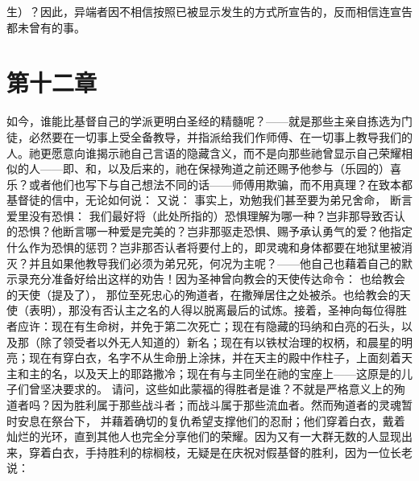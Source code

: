 生）？因此，异端者因不相信按照已被显示发生的方式所宣告的，反而相信连宣告都未曾有的事。\par


\section{第十二章}

如今，谁能比基督自己的学派更明白圣经的精髓呢？——就是那些主亲自拣选为门徒，必然要在一切事上受全备教导，并指派给我们作师傅、在一切事上教导我们的人。祂更愿意向谁揭示祂自己言语的隐藏含义，而不是向那些祂曾显示自己荣耀相似的人——即、和，以及后来的，祂在保禄殉道之前还赐予他参与（乐园的）喜乐？或者他们也写下与自己想法不同的话——师傅用欺骗，而不用真理？在致本都基督徒的信中，无论如何说：  又说：  事实上，劝勉我们甚至要为弟兄舍命， 断言爱里没有恐惧：  我们最好将（此处所指的）恐惧理解为哪一种？岂非那导致否认的恐惧？他断言哪一种爱是完美的？岂非那驱走恐惧、赐予承认勇气的爱？他指定什么作为恐惧的惩罚？岂非那否认者将要付上的，即灵魂和身体都要在地狱里被消灭？并且如果他教导我们必须为弟兄死，何况为主呢？——他自己也藉着自己的默示录充分准备好给出这样的劝告！因为圣神曾向教会的天使传达命令：  也给教会的天使（提及了）， 那位至死忠心的殉道者，在撒殚居住之处被杀。也给教会的天使（表明），那没有否认主之名的人得以脱离最后的试炼。接着，圣神向每位得胜者应许：现在有生命树，并免于第二次死亡；现在有隐藏的玛纳和白亮的石头，以及那（除了领受者以外无人知道的）新名；现在有以铁杖治理的权柄，和晨星的明亮；现在有穿白衣，名字不从生命册上涂抹，并在天主的殿中作柱子，上面刻着天主和主的名，以及天上的耶路撒冷；现在有与主同坐在祂的宝座上——这原是的儿子们曾坚决要求的。 请问，这些如此蒙福的得胜者是谁？不就是严格意义上的殉道者吗？因为胜利属于那些战斗者；而战斗属于那些流血者。然而殉道者的灵魂暂时安息在祭台下， 并藉着确切的复仇希望支撑他们的忍耐；他们穿着白衣，戴着灿烂的光环，直到其他人也完全分享他们的荣耀。因为又有一大群无数的人显现出来，穿着白衣，手持胜利的棕榈枝，无疑是在庆祝对假基督的胜利，因为一位长老说：  